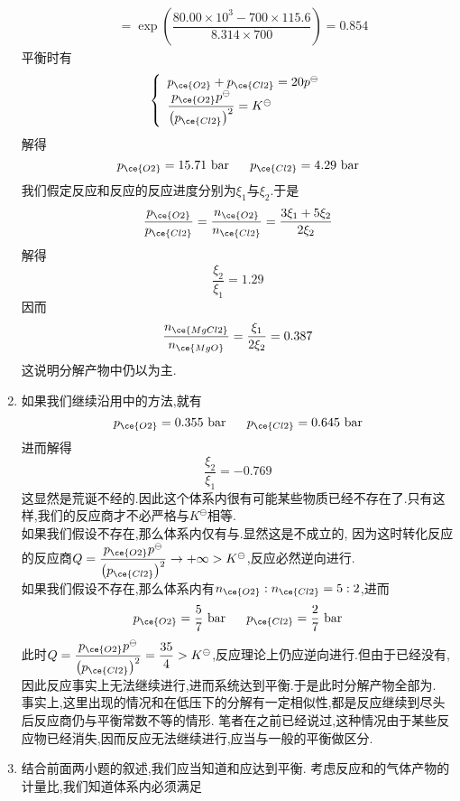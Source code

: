 \documentclass{ctexart}
\begin{document}
\begin{solution}
\begin{enumerate}[label=\tbf{\arabic{Pcounter}-\arabic*},topsep=0pt,parsep=0pt,itemsep=0pt,partopsep=0pt]
\[\begin{aligned}
                &= \exp\left(\dfrac{80.00\times10^3-700\times115.6}{8.314\times700}\right)=0.854
            \end{aligned}\]
            平衡时有
            \[\left\{\begin{array}{l}
                p_{\ce{O2}}+p_{\ce{Cl2}}=20p^\ominus\\
                \dfrac{p_{\ce{O2}}p^\ominus}{\left(p_{\ce{Cl2}}\right)^2}=K^\ominus
            \end{array}\right.\]
            解得
            \[p_{\ce{O2}}=15.71\text{ bar}\ \ \ \ \ p_{\ce{Cl2}}=4.29\text{ bar}\]
            我们假定反应和反应的反应进度分别为$\xi_1$与$\xi_2$.于是
            \[\dfrac{p_{\ce{O2}}}{p_{\ce{Cl2}}}
            =\dfrac{n_{\ce{O2}}}{n_{\ce{Cl2}}}
            =\dfrac{3\xi_1+5\xi_2}{2\xi_2}\]
            解得
            \[\dfrac{\xi_2}{\xi_1}=1.29\]
            因而
            \[\dfrac{n_{\ce{MgCl2}}}{n_{\ce{MgO}}}=\dfrac{\xi_1}{2\xi_2}=0.387\]
            这说明分解产物中仍以为主.
        \item 如果我们继续沿用中的方法,就有
            \[p_{\ce{O2}}=0.355\text{ bar}\ \ \ \ \ p_{\ce{Cl2}}=0.645\text{ bar}\]
            进而解得
            \[\dfrac{\xi_2}{\xi_1}=-0.769\]
            这显然是荒诞不经的.因此这个体系内很有可能某些物质已经不存在了.只有这样,我们的反应商才不必严格与$K^\ominus$相等.\\
            如果我们假设不存在,那么体系内仅有与.显然这是不成立的,%
            因为这时转化反应的反应商$Q=\dfrac{p_{\ce{O2}}p^\ominus}{\left(p_{\ce{Cl2}}\right)^2}\to+\infty>K^\ominus$,反应必然逆向进行.\\
            如果我们假设不存在,那么体系内有$n_{\ce{O2}}:n_{\ce{Cl2}}=5:2$,进而
            \[p_{\ce{O2}}=\dfrac57\text{ bar}\ \ \ \ \ p_{\ce{Cl2}}=\dfrac{2}{7}\text{ bar}\]
            此时$Q=\dfrac{p_{\ce{O2}}p^\ominus}{\left(p_{\ce{Cl2}}\right)^2}=\dfrac{35}{4}>K^\ominus$,反应理论上仍应逆向进行.但由于已经没有,%
            因此反应事实上无法继续进行,进而系统达到平衡.于是此时分解产物全部为.\\
            事实上,这里出现的情况和在低压下的分解有一定相似性,都是反应继续到尽头后反应商仍与平衡常数不等的情形.%
            笔者在之前已经说过,这种情况由于某些反应物已经消失,因而反应无法继续进行,应当与一般的平衡做区分.
        \item 结合前面两小题的叙述,我们应当知道和应达到平衡.%
            考虑反应和的气体产物的计量比,我们知道体系内必须满足

\end{enumerate}
\end{solution}
\end{document}
